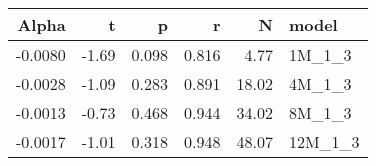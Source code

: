 \begin{table}[ht]
\centering
\begin{tabular}{rrrrrl}
  \hline
Alpha & t & p & r & N & model \\ 
  \hline
-0.0080 & -1.69 & 0.098 & 0.816 & 4.77 & 1M\_1\_3 \\ 
  -0.0028 & -1.09 & 0.283 & 0.891 & 18.02 & 4M\_1\_3 \\ 
  -0.0013 & -0.73 & 0.468 & 0.944 & 34.02 & 8M\_1\_3 \\ 
  -0.0017 & -1.01 & 0.318 & 0.948 & 48.07 & 12M\_1\_3 \\ 
   \hline
\end{tabular}
\end{table}


